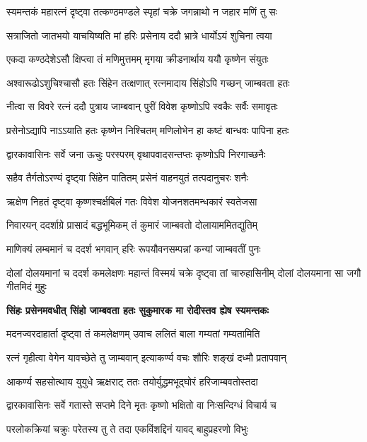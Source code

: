 \twolineshloka
{स्यमन्तकं महारत्नं दृष्ट्वा तत्कण्ठमण्डले}
{स्पृहां चक्रे जगन्नाथो न जहार मणिं तु सः}%

\twolineshloka
{सत्राजितो जातभयो याचयिष्यति मां हरिः}
{प्रसेनाय ददौ भ्रात्रे धार्योऽयं शुचिना त्वया}%

\twolineshloka
{एकदा कण्ठदेशेऽसौ क्षिप्त्वा तं मणिमुत्तमम्}
{मृगया क्रीडनार्थाय ययौ कृष्णेन संयुतः}%

\twolineshloka
{अश्वारूढोऽशुचिश्चासौ हतः सिंहेन तत्क्षणात्}
{रत्नमादाय सिंहोऽपि गच्छन् जाम्बवता हतः}%

\twolineshloka
{नीत्वा स विवरे रत्नं ददौ पुत्राय जाम्बवान्}
{पुरीं विवेश कृष्णोऽपि स्वकैः सर्वैः समावृतः}%

\twolineshloka
{प्रसेनोऽद्यापि नाऽऽयाति हतः कृष्णेन निश्चितम्}
{मणिलोभेन हा कष्टं बान्धवः पापिना हतः}%

\twolineshloka
{द्वारकावासिनः सर्वे जना ऊचुः परस्परम्}
{वृथापवादसन्तप्तः कृष्णोऽपि निरगाच्छनैः}%

\twolineshloka
{सहैव तैर्गतोऽरण्यं दृष्ट्वा सिंहेन पातितम्}
{प्रसेनं वाहनयुतं तत्पदानुचरः शनैः}%

\twolineshloka
{ऋक्षेण निहतं दृष्ट्वा कृष्णश्चर्क्षबिलं गतः}
{विवेश योजनशतमन्धकारं स्वतेजसा}%

\twolineshloka
{निवारयन् ददर्शाग्रे प्रासादं बद्धभूमिकम्}
{तं कुमारं जाम्बवतो दोलायाममितद्युतिम्}%

\twolineshloka
{माणिक्यं लम्बमानं च ददर्श भगवान् हरिः}
{रूपयौवनसम्पन्नां कन्यां जाम्बवतीं पुनः}%

\threelineshloka
{दोलां दोलयमानां च ददर्श कमलेक्षणः}
{महान्तं विस्मयं चक्रे दृष्ट्वा तां चारुहासिनीम्}
{दोलां दोलयमाना सा जगौ गीतमिदं मुहुः}%

\begingroup
\bfseries
\twolineshloka
{सिंहः प्रसेनमवधीत् सिंहो जाम्बवता हतः}
{सुकुमारक मा रोदीस्तव ह्येष स्यमन्तकः}%
\endgroup

\twolineshloka
{मदनज्वरदाहार्ता दृष्ट्वा तं कमलेक्षणम्}
{उवाच ललितं बाला गम्यतां गम्यतामिति}%

\twolineshloka
{रत्नं गृहीत्वा वेगेन यावच्छेते तु जाम्बवान्}
{इत्याकर्ण्य वचः शौरिः शङ्खं दध्मौ प्रतापवान्}%

\twolineshloka
{आकर्ण्य सहसोत्थाय युयुधे ऋक्षराट् ततः}
{तयोर्युद्धमभूद्घोरं हरिजाम्बवतोस्तदा}%

\twolineshloka
{द्वारकावासिनः सर्वे गतास्ते सप्तमे दिने}
{मृतः कृष्णो भक्षितो वा निःसन्दिग्धं विचार्य च}%

\twolineshloka
{परलोकक्रियां चक्रुः परेतस्य तु ते तदा}
{एकविंशद्दिनं यावद् बाहुप्रहरणो विभुः}%

